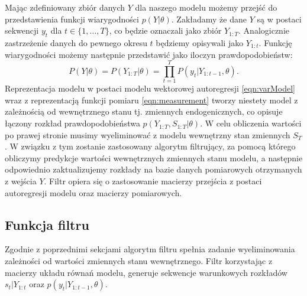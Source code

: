 Mając zdefiniowany zbiór danych $Y$ dla naszego modelu możemy przejść  do przedstawienia funkcji wiarygodności $p(Y|\theta)$. Zakładamy że dane $Y$ są w postaci sekwencji $y_t$ dla $t \in \{1,\dots, T\}$, co będzie oznaczali jako zbiór $Y_{1:T}$. Analogicznie zastrzeżenie danych do pewnego okresu $t$ będziemy opisywali jako $Y_{1:t}$. Funkcję wiarygodności możemy następnie przedstawić jako iloczyn prawdopodobieństw:
\begin{equation}
    P(Y | \theta) = P(Y_{1:T} | \theta) = \prod_{t=1}^T P(y_t|Y_{1:t-1},\theta).
\end{equation}
Reprezentacja modelu w postaci modelu wektorowej autoregresji \eqref{eqn:varModel} wraz z reprezentacją funkcji pomiaru \eqref{eqn:measurement} tworzy niestety model z zależnością od wewnętrznego stanu tj. zmiennych endogenicznych, co opisuje łączony rozkład prawdopodobieństwa $p(Y_{1:T}, S_{1:T}|\theta)$. W celu obliczenia wartości po prawej stronie musimy wyeliminować z modelu wewnętrzny stan zmiennych $S_T$. W związku z tym zostanie zastosowany algorytm filtrujący, za pomocą którego obliczymy predykcje wartości wewnętrznych zmiennych stanu modelu, a następnie odpowiednio zaktualizujemy rozkłady na bazie danych pomiarowych otrzymanych z wejścia $Y$. Filtr opiera się o zastosowanie macierzy przejścia z postaci autoregresji modelu oraz macierzy pomiarowych.

\subsection{Funkcja filtru}
\label{sec:filter_function}

Zgodnie z poprzednimi sekcjami algorytm filtru spełnia zadanie wyeliminowania zależności od wartości zmiennych stanu wewnętrznego. Filtr korzystając z macierzy układu równań modelu, generuje sekwencje warunkowych rozkładów $s_t|Y_{1:t}$ oraz $p(y_t|Y_{1:t-1}, \theta)$.

